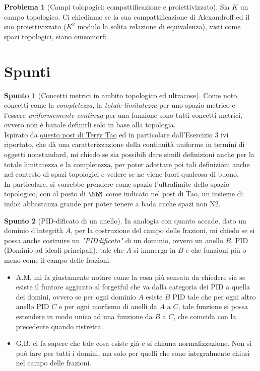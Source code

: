 \documentclass[a4paper,NoNotes,GeneralMath]{stdmdoc}
\theoremstyle{definition}
\newtheorem{problema}{Problema}
\newtheorem{spunto}{Spunto}
\begin{document}
	\begin{problema}[Campi tolopogici: compattificazione e proiettivizzato]
		Sia $K$ un campo topologico. Ci chiediamo se la sua compattificazione di Alexandroff ed il suo proiettivizzato ($K^2$ modulo la solita relazione di equivalenza), visti come spazi topologici, siano omeomorfi.
	\end{problema}

	\section {Spunti}
	\begin{spunto}[Concetti metrici in ambito topologico ed ultracose]
		Come noto, concetti come la {\it completezza}, la {\it totale limitatezza} per uno spazio metrico e l'essere {\it uniformemente continua} per una funzione sono tutti concetti metrici, ovvero non è banale definirli solo in base alla topologia. \\
		Ispirato da \href{https://terrytao.wordpress.com/2012/04/02/a-cheap-version-of-nonstandard-analysis/}{questo post di Terry Tao} ed in particolare dall'Esercizio 3 ivi riportato, che dà una caratterizzazione della continuità uniforme in termini di oggetti nonstandard, mi chiedo se sia possibili dare simili definizioni anche per la totale limitatezza e la completezza, per poter adottare poi tali definizioni anche nel contesto di spazi topologici e vedere se ne viene fuori qualcosa di buono. \\
		In particolare, si vorrebbe prendere come spazio l'ultralimite dello spazio topologico, con al posto di $\bbN$ come indicato nel post di Tao, un insieme di indici abbastanza grande per poter tenere a bada anche spazi non N2.
	\end{spunto}
	
	\begin{spunto}[PID-dificato di un anello]
		In analogia con quanto accade, dato un dominio d'integrità $A$, per la costruzione del campo delle frazioni, mi chiedo se si possa anche costruire un {\it "PIDdificato"} di un dominio, ovvero un anello $B$, PID (Dominio ad ideali principali), tale che $A$ si immerga in $B$ e che funzioni più o meno come il campo delle frazioni.
		\begin{itemize}
			\item A.M. mi fa giustamente notare come la cosa più sensata da chiedere sia se esiste il funtore aggiunto al forgetful che va dalla categoria dei PID a quella dei domini, ovvero se per ogni dominio $A$ esiste $B$ PID tale che per ogni altro anello PID $C$ e per ogni morfismo di anelli da $A$ a $C$, tale funzione si possa estendere in modo unico ad una funzione da $B$ a $C$, che coincida con la precedente quando ristretta.
			\item G.B. ci fa sapere che tale cosa esiste già e si chiama normalizzazione. Non si può fare per tutti i domini, ma solo per quelli che sono integralmente chiusi nel campo delle frazioni.
		\end{itemize}
	\end{spunto}
	
\end{document}
